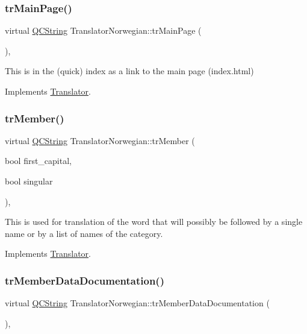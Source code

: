 \subsubsection{\texorpdfstring{trMainPage()}{trMainPage()}}
{\footnotesize\ttfamily virtual \mbox{\hyperlink{class_q_c_string}{Q\+C\+String}} Translator\+Norwegian\+::tr\+Main\+Page (\begin{DoxyParamCaption}{ }\end{DoxyParamCaption})\hspace{0.3cm}{\ttfamily [inline]}, {\ttfamily [virtual]}}

This is in the (quick) index as a link to the main page (index.\+html) 

Implements \mbox{\hyperlink{class_translator}{Translator}}.

\mbox{\label{class_translator_norwegian_a0ef9f079ffda230be8149e31c1a32137}} 
\subsubsection{\texorpdfstring{trMember()}{trMember()}}
{\footnotesize\ttfamily virtual \mbox{\hyperlink{class_q_c_string}{Q\+C\+String}} Translator\+Norwegian\+::tr\+Member (\begin{DoxyParamCaption}\item[{bool}]{first\+\_\+capital,  }\item[{bool}]{singular }\end{DoxyParamCaption})\hspace{0.3cm}{\ttfamily [inline]}, {\ttfamily [virtual]}}

This is used for translation of the word that will possibly be followed by a single name or by a list of names of the category. 

Implements \mbox{\hyperlink{class_translator}{Translator}}.

\mbox{\label{class_translator_norwegian_aabe91143366a9516431f61b5fd2cf409}} 
\subsubsection{\texorpdfstring{trMemberDataDocumentation()}{trMemberDataDocumentation()}}
{\footnotesize\ttfamily virtual \mbox{\hyperlink{class_q_c_string}{Q\+C\+String}} Translator\+Norwegian\+::tr\+Member\+Data\+Documentation (\begin{DoxyParamCaption}{ }\end{DoxyParamCaption})\hspace{0.3cm}{\ttfamily [inline]}, {\ttfamily [virtual]}}

